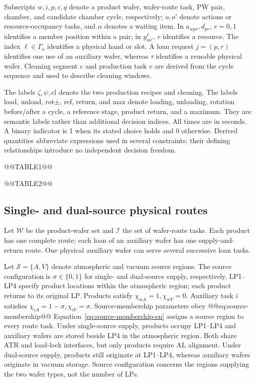 Subscripts $w,i,p,c,q$ denote a product wafer, wafer-route task, PW pair, chamber, and candidate chamber cycle, respectively; $o,o'$ denote actions or resource-occupancy tasks, and $\alpha$ denotes a waiting item. In $a_{wpr},d_{pr}$, $r=0,1$ identifies a member position within a pair; in $y^r_{oo'}$, $r$ identifies a resource. The index $\ell\in\Gamma_o$ identifies a physical hand or slot. A loan request $j=(p,r)$ identifies one use of an auxiliary wafer, whereas $\tau$ identifies a reusable physical wafer. Cleaning segment $e$ and production task $v$ are derived from the cycle sequence and used to describe cleaning windows.

The labels $\zeta,\psi,\mathrm{cl}$ denote the two production recipes and cleaning. The labels load, unload, rot$\pm$, ref, return, and max denote loading, unloading, rotation before/after a cycle, a reference stage, product return, and a maximum. They are semantic labels rather than additional decision indices. All times are in seconds. A binary indicator is 1 when its stated choice holds and 0 otherwise. Derived quantities abbreviate expressions used in several constraints; their defining relationships introduce no independent decision freedom.

@@TABLE1@@

@@TABLE2@@

\subsection{Single- and dual-source physical routes}
\label{sec:model-path-en}

Let $\mathcal W$ be the product-wafer set and $\mathcal I$ the set of wafer-route tasks. Each product has one complete route; each loan of an auxiliary wafer has one supply-and-return route. One physical auxiliary wafer can serve several successive loan tasks.

Let $\mathcal S=\{A,V\}$ denote atmospheric and vacuum source regions. The source configuration is $\sigma\in\{0,1\}$ for single- and dual-source supply, respectively. LP1--LP4 specify product locations within the atmospheric region; each product returns to its original LP. Products satisfy $\chi_{wA}=1,\chi_{wV}=0$. Auxiliary task $i$ satisfies $\chi_{iA}=1-\sigma,\chi_{iV}=\sigma$. Source-membership parameters obey
@@eq:source-membership@@
Equation~\eqref{eq:source-membership-en} assigns a source region to every route task. Under single-source supply, products occupy LP1--LP4 and auxiliary wafers are stored beside LP4 in the atmospheric region. Both share ATR and load-lock interfaces, but only products require AL alignment. Under dual-source supply, products still originate at LP1--LP4, whereas auxiliary wafers originate in vacuum storage. Source configuration concerns the regions supplying the two wafer types, not the number of LPs.

